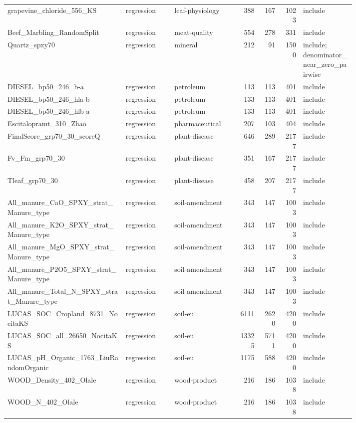 \begin{longtable}{L{0.34\linewidth}L{0.14\linewidth}L{0.18\linewidth}rrrL{0.15\linewidth}}
grapevine\_chloride\_556\_KS & regression & leaf-physiology & 388 & 167 & 1023 & include \\
Beef\_Marbling\_RandomSplit & regression & meat-quality & 554 & 278 & 331 & include \\
Quartz\_spxy70 & regression & mineral & 212 & 91 & 1500 & include; denominator\_near\_zero\_pairwise \\
DIESEL\_bp50\_246\_b-a & regression & petroleum & 113 & 113 & 401 & include \\
DIESEL\_bp50\_246\_hla-b & regression & petroleum & 133 & 113 & 401 & include \\
DIESEL\_bp50\_246\_hlb-a & regression & petroleum & 133 & 113 & 401 & include \\
Escitalopramt\_310\_Zhao & regression & pharmaceutical & 207 & 103 & 404 & include \\
FinalScore\_grp70\_30\_scoreQ & regression & plant-disease & 646 & 289 & 2177 & include \\
Fv\_Fm\_grp70\_30 & regression & plant-disease & 351 & 167 & 2177 & include \\
Tleaf\_grp70\_30 & regression & plant-disease & 458 & 207 & 2177 & include \\
All\_manure\_CaO\_SPXY\_strat\_Manure\_type & regression & soil-amendment & 343 & 147 & 1003 & include \\
All\_manure\_K2O\_SPXY\_strat\_Manure\_type & regression & soil-amendment & 343 & 147 & 1003 & include \\
All\_manure\_MgO\_SPXY\_strat\_Manure\_type & regression & soil-amendment & 343 & 147 & 1003 & include \\
All\_manure\_P2O5\_SPXY\_strat\_Manure\_type & regression & soil-amendment & 343 & 147 & 1003 & include \\
All\_manure\_Total\_N\_SPXY\_strat\_Manure\_type & regression & soil-amendment & 343 & 147 & 1003 & include \\
LUCAS\_SOC\_Cropland\_8731\_NocitaKS & regression & soil-eu & 6111 & 2620 & 4200 & include \\
LUCAS\_SOC\_all\_26650\_NocitaKS & regression & soil-eu & 13325 & 5711 & 4200 & include \\
LUCAS\_pH\_Organic\_1763\_LiuRandomOrganic & regression & soil-eu & 1175 & 588 & 4200 & include \\
WOOD\_Density\_402\_Olale & regression & wood-product & 216 & 186 & 1038 & include \\
WOOD\_N\_402\_Olale & regression & wood-product & 216 & 186 & 1038 & include \\
\bottomrule
\end{longtable}
